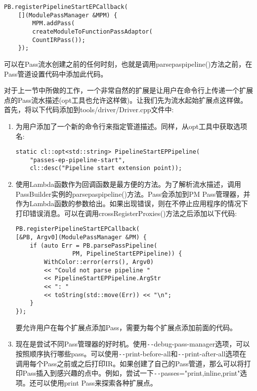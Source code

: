 \begin{lstlisting}[caption={}]
PB.registerPipelineStartEPCallback(
	[](ModulePassManager &MPM) {
		MPM.addPass(
		createModuleToFunctionPassAdaptor(
		CountIRPass());
	});
\end{lstlisting}

可以在Pass流水创建之前的任何时刻，也就是调用parsepaspipeline()方法之前，在Pass管道设置代码中添加此代码。\par

对于上一节中所做的工作，一个非常自然的扩展是让用户在命令行上传递一个扩展点的Pass流水描述(opt工具也允许这样做)。让我们先为流水起始扩展点这样做。首先，将以下代码添加到tools/driver/Driver.cpp文件中:\par

\begin{enumerate}
\item 为用户添加了一个新的命令行来指定管道描述。同样，从opt工具中获取选项名:
\begin{lstlisting}[caption={}]
static cl::opt<std::string> PipelineStartEPPipeline(
	"passes-ep-pipeline-start",
	cl::desc("Pipeline start extension point));
\end{lstlisting}

\item 使用Lambda函数作为回调函数是最方便的方法。为了解析流水描述，调用PassBuilder实例的parsepaspipeline()方法。Pass会添加到PM Pass管理器，并作为Lambda函数的参数给出。如果出现错误，则在不停止应用程序的情况下打印错误消息。可以在调用crossRegisterProxies()方法之后添加以下代码:
\begin{lstlisting}[caption={}]
PB.registerPipelineStartEPCallback(
[&PB, Argv0](ModulePassManager &PM) {
	if (auto Err = PB.parsePassPipeline(
				PM, PipelineStartEPPipeline)) {
		WithColor::error(errs(), Argv0)
		<< "Could not parse pipeline "
		<< PipelineStartEPPipeline.ArgStr 
		<< ": "
		<< toString(std::move(Err)) << "\n";
	}
});
\end{lstlisting}
\begin{tcolorbox}[colback=blue!5!white,colframe=blue!75!black, title=Tip]
要允许用户在每个扩展点添加Pass，需要为每个扩展点添加前面的代码。
\end{tcolorbox}

\item 现在是尝试不同Pass管理器的好时机。使用\verb|--|debug-pass-manager选项，可以按照顺序执行哪些pass。可以使用\verb|--|print-before-all和\verb|--|print-after-all选项在调用每个Pass之前或之后打印IR。如果创建了自己的Pass管道，那么可以将打印Pass插入到感兴趣的点中。例如，尝试一下\verb|--|passes="print,inline,print"选项。还可以使用print Pass来探索各种扩展点。


\end{enumerate}
